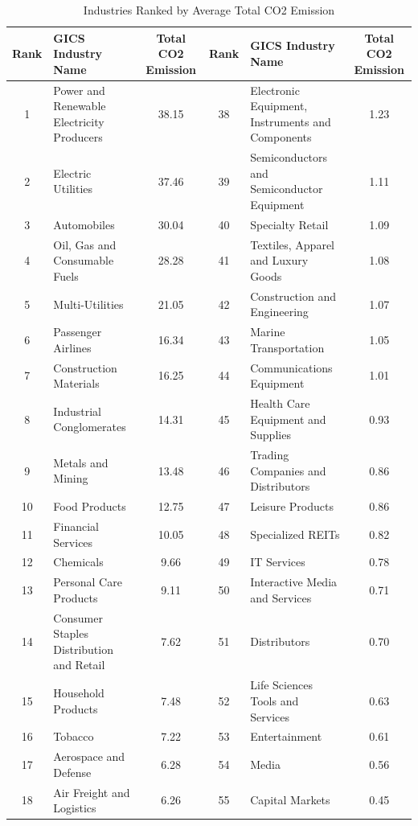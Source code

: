 \documentclass[12pt]{article}
\begin{document}
\begin{landscape}
\begin{table}[!ht]
\scriptsize
\centering
\caption{Industries Ranked by Average Total CO2 Emission}
\label{tab: industries rank}
\begin{tabular}{clcclc}
\toprule
 Rank &                                 GICS Industry Name &  Total CO2 Emission &  Rank &                               GICS Industry Name &  Total CO2 Emission \\
\midrule
1 & Power and Renewable Electricity Producers & 38.15 & 38 & Electronic Equipment, Instruments and Components & 1.23 \\
2 & Electric Utilities & 37.46 & 39 & Semiconductors and Semiconductor Equipment & 1.11 \\
3 & Automobiles & 30.04 & 40 & Specialty Retail & 1.09 \\
4 & Oil, Gas and Consumable Fuels & 28.28 & 41 & Textiles, Apparel and Luxury Goods & 1.08 \\
5 & Multi-Utilities & 21.05 & 42 & Construction and Engineering & 1.07 \\
6 & Passenger Airlines & 16.34 & 43 & Marine Transportation & 1.05 \\
7 & Construction Materials & 16.25 & 44 & Communications Equipment & 1.01 \\
8 & Industrial Conglomerates & 14.31 & 45 & Health Care Equipment and Supplies & 0.93 \\
9 & Metals and Mining & 13.48 & 46 & Trading Companies and Distributors & 0.86 \\
10 & Food Products & 12.75 & 47 & Leisure Products & 0.86 \\
11 & Financial Services & 10.05 & 48 & Specialized REITs & 0.82 \\
12 & Chemicals & 9.66 & 49 & IT Services & 0.78 \\
13 & Personal Care Products & 9.11 & 50 & Interactive Media and Services & 0.71 \\
14 & Consumer Staples Distribution and Retail & 7.62 & 51 & Distributors & 0.70 \\
15 & Household Products & 7.48 & 52 & Life Sciences Tools and Services & 0.63 \\
16 & Tobacco & 7.22 & 53 & Entertainment & 0.61 \\
17 & Aerospace and Defense & 6.28 & 54 & Media & 0.56 \\
18 & Air Freight and Logistics & 6.26 & 55 & Capital Markets & 0.45 \\

\end{tabular}
\end{table}
\end{landscape}
\end{document}
